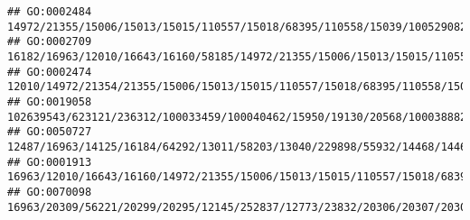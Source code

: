 \documentclass[
]{article}
\begin{document}
\begin{verbatim}
## GO:0002484                                                                                                                                                                                                                                                                                                                   14972/21355/15006/15013/15015/110557/15018/68395/110558/15039/100529082/15024/667977/14990
## GO:0002709                                                                                                                                                                                                                                                                   16182/16963/12010/16643/16160/58185/14972/21355/15006/15013/15015/110557/15018/68395/110558/15039/100529082/15024/667977/14990/60533/20371
## GO:0002474                                                                                                                                                                                                                                                                                                       12010/14972/21354/21355/15006/15013/15015/110557/15018/68395/110558/15039/100529082/15024/667977/14990
## GO:0019058                                                                                                                                                                                     102639543/623121/236312/100033459/100040462/15950/19130/20568/100038882/23962/231655/246728/246727/23961/23960/246730/94094/76681/434219/20128/209387/68713/69550/20307/20304/58185/12265/71223/17858/54419/224762/16149
## GO:0050727                                                                                                                                                             12487/16963/14125/16184/64292/13011/58203/13040/229898/55932/14468/14469/19218/100061/56221/109648/20617/243958/72310/16170/244202/15930/11988/17394/81897/237310/16160/18858/637515/20304/12775/13421/17228/21943/81799/54483/57757/20371/12229
## GO:0001913                                                                                                                                                                                                                                                                                           16963/12010/16643/16160/14972/21355/15006/15013/15015/110557/15018/68395/110558/15039/100529082/15024/667977/14990
## GO:0070098                                                                                                                                                                                                                                                                                                 16963/20309/56221/20299/20295/12145/252837/12773/23832/20306/20307/20304/20303/12775/12777/19876/12458/12766

\end{verbatim}
\end{document}

